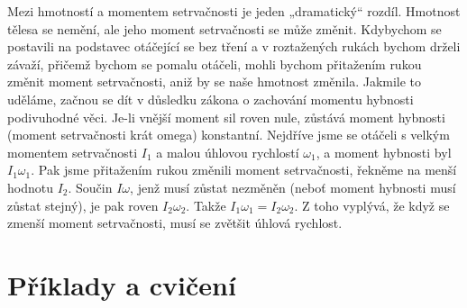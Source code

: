     Mezi hmotností a momentem setrvačnosti je jeden „dramatický“ rozdíl. Hmotnost tělesa se nemění,
    ale jeho moment setrvačnosti se může změnit. Kdybychom se postavili na podstavec otáčející se
    bez tření a v roztažených rukách bychom drželi závaží, přičemž bychom se pomalu otáčeli, mohli
    bychom přitažením rukou změnit moment setrvačnosti, aniž by se naše hmotnost změnila. Jakmile to
    uděláme, začnou se dít v důsledku zákona o zachování momentu hybnosti podivuhodné věci. Je-li
    vnější moment sil roven nule, zůstává moment hybnosti (moment setrvačnosti krát omega)
    konstantní. Nejdříve jsme se otáčeli s velkým momentem setrvačnosti \(I_1\) a malou úhlovou
    rychlostí \(ω_1\), a moment hybnosti byl \(I_1ω_1\). Pak jsme přitažením rukou změnili moment
    setrvačnosti, řekněme na menší hodnotu \(I_2\). Součin \(Iω\), jenž musí zůstat nezměněn (neboť
    moment hybnosti musí zůstat stejný), je pak roven \(I_2ω_2\). Takže \(I_1ω_1=I_2ω_2\). Z toho
    vyplývá, že když se zmenší moment setrvačnosti, musí se zvětšit úhlová rychlost.


  \section{Příklady a cvičení}\label{fyz:IchapXVIIIsecVI}
